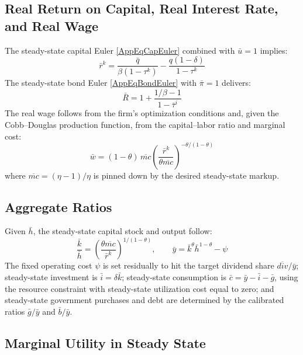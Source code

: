 \subsection{Real Return on Capital, Real Interest Rate, and Real Wage}

The steady-state capital Euler \eqref{AppEqCapEuler} combined with $\bar{u} = 1$ implies:
\begin{equation}\label{AppEqSSrk}
    \bar{r}^k = \frac{\bar{q}}{\beta(1 - \tau^k)} - \frac{q(1-\delta)}{1-\tau^k}
\end{equation}
The steady-state bond Euler \eqref{AppEqBondEuler} with $\bar{\pi} = 1$ delivers:
\begin{equation}\label{AppEqSSR}
    \bar{R} = 1 + \frac{1/\beta - 1}{1 - \bar{\tau}^i}
\end{equation}
The real wage follows from the firm's optimization conditions and, given the Cobb--Douglas production function, from the capital--labor ratio and marginal cost:
\begin{equation}\label{AppEqSSw}
    \bar{w} = (1-\theta)\,\overline{mc}\left(\frac{\bar{r}^k}{\theta \overline{mc}}\right)^{-\theta/(1-\theta)}
\end{equation}
where $\overline{mc} = (\eta - 1)/\eta$ is pinned down by the desired steady-state markup.

\subsection{Aggregate Ratios}

Given $\bar{h}$, the steady-state capital stock and output follow:
\begin{equation}\label{AppEqSSKY}
    \frac{\bar{k}}{\bar{h}} = \left(\frac{\theta \overline{mc}}{\bar{r}^k}\right)^{1/(1-\theta)}, \qquad
    \bar{y} = \bar{k}^\theta \bar{h}^{1-\theta} - \psi
\end{equation}
The fixed operating cost $\psi$ is set residually to hit the target dividend share $\overline{div}/\bar{y}$; steady-state investment is $\bar{i} = \delta \bar{k}$; steady-state consumption is $\bar{c} = \bar{y} - \bar{i} - \bar{g}$, using the resource constraint with steady-state utilization cost equal to zero; and steady-state government purchases and debt are determined by the calibrated ratios $\bar{g}/\bar{y}$ and $\bar{b}/\bar{y}$.

\subsection{Marginal Utility in Steady State}

